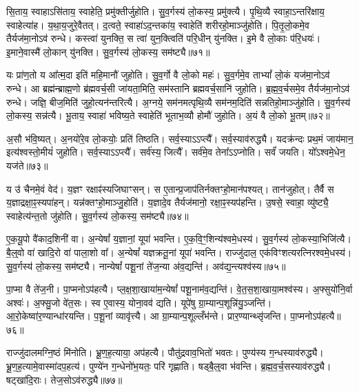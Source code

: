 सि॒ताय॒ स्वाहा\-ऽसि॑ताय॒ स्वाहेति॒ प्रमु॑क्तीर्जुहोति।
सु॒व॒र्गस्य॑ लो॒कस्य॒ प्रमु॑क्त्यै।
पृ॒थि॒व्यै स्वाहा॒\-ऽन्तरि॑क्षाय॒ स्वाहेत्या॑ह।
य॒था॒\-य॒जु\-रे॒वै\-तत्।
द॒त्वते॒ स्वाहा॑\-ऽद॒न्तका॑य॒ स्वाहेति॑ शरीरहो॒माञ्जु॑होति।
पि॒तृ॒लो॒कमे॒व तैर्यज॑मा॒नोऽव॑ रुन्धे।
कस्त्वा॑ युनक्ति॒ स त्वा॑ युन॒क्त्विति॑ परि॒धीन् यु॑नक्ति।
इ॒मे वै लो॒काः प॑रि॒धयः॑।
इ॒माने॒वास्मै॑ लो॒कान् यु॑नक्ति।
सु॒व॒र्गस्य॑ लो॒कस्य॒ सम॑ष्ट्यै॥७१॥

यः प्रा॑ण॒तो य आ᳚त्म॒दा इति॑ महि॒मानौ॑ जुहोति।
सु॒व॒र्गो वै लो॒को महः॑।
सु॒व॒र्गमे॒व ताभ्यां᳚ लो॒कं यज॑मा॒नोऽव॑ रुन्धे।
आ ब्रह्म॑न्ब्राह्म॒णो ब्र॑ह्म\-वर्च॒सी जा॑यता॒मिति॒ सम॑स्तानि ब्रह्मवर्च॒सानि॑ जुहोति।
ब्र॒ह्म॒व॒र्चसमे॒व तैर्यज॑मा॒नोऽव॑ रुन्धे।
जज्ञि॒ बीज॒मिति॑ जुहो॒त्यन॑न्तरित्यै।
अ॒ग्नये॒ सम॑नमत्पृथि॒व्यै सम॑नम॒दिति॑ सन्नतिहो॒माञ्जु॑होति।
सु॒व॒र्गस्य॑ लो॒कस्य॒ सन्न॑त्यै।
भू॒ताय॒ स्वाहा॑ भविष्य॒ते स्वाहेति॑ भूताभ॒व्यौ होमौ॑ जुहोति।
अ॒यं वै लो॒को भू॒तम्॥७२॥

अ॒सौ भ॑वि॒ष्यत्।
अ॒नयो॑रे॒व लो॒कयोः॒ प्रति॑ तिष्ठति।
सर्व॒स्याऽऽप्त्यै᳚।
सर्व॒स्याव॑रुद्ध्यै।
यदक्र॑न्दः प्रथ॒मं जाय॑मान॒ इत्य॑श्वस्तो॒मीयं॑ जुहोति।
सर्व॒स्याऽऽप्त्यै᳚।
सर्व॑स्य॒ जित्यै᳚।
सर्व॑मे॒व तेना᳚ऽऽप्नोति।
सर्वं॑ जयति।
यो᳚ऽश्वमे॒धेन॒ यज॑ते॥७३॥

य उ॑ चैनमे॒वं वेद॑।
य॒ज्ञꣳ रक्षाꣴ॑स्यजिघाꣳसन्।
स ए॒तान्प्र॒जा\-प॑तिर्नक्तꣳहो॒मान॑पश्यत्।
तान॑जुहोत्।
तैर्वै स य॒ज्ञाद्रक्षा॒ꣴ॒स्यपा॑हन्।
यन्न॑क्तꣳहो॒माञ्जु॒होति॑।
य॒ज्ञादे॒व तैर्यज॑मानो॒ रक्षा॒ꣴ॒स्यप॑हन्ति।
उ॒षसे॒ स्वाहा॒ व्यु॑ष्ट्यै॒ स्वाहेत्य॑न्त॒तो जु॑होति।
सु॒व॒र्गस्य॑ लो॒कस्य॒ सम॑ष्ट्यै॥७४॥\anuvakamend[वै नभाꣳ॑सि॒ सूर्यो॒ ज्योतिः॒ सन्त॑त्यै॒ सम॑ष्ट्यै भू॒तं यज॑ते॒ नव॑ च]

ए॒क॒यू॒पो वै॑काद॒शिनी॑ वा।
अ॒न्येषां᳚ य॒ज्ञानां॒ यूपा॑ भवन्ति।
ए॒क॒वि॒ꣳ॒शिन्य॑श्वमे॒धस्य॑।
सु॒व॒र्गस्य॑ लो॒कस्या॒भिजि॑त्यै।
बै॒ल्॒वो वा॑ खादि॒रो वा॑ पाला॒शो वा᳚।
अ॒न्येषां᳚ यज्ञक्रतू॒नां यूपा॑ भवन्ति।
राज्जु॑दाल॒ एक॑विꣳशत्यरत्निरश्वमे॒धस्य॑।
सु॒व॒र्गस्य॑ लो॒कस्य॒ सम॑ष्ट्यै।
नान्येषां᳚ पशू॒नां ते॑ज॒न्या अ॑व॒द्यन्ति॑।
अव॑द्य॒न्त्यश्व॑स्य॥७५॥

पा॒प्मा वै ते॑ज॒नी।
पा॒प्मनो\-ऽप॑हत्यै।
प्ल॒क्ष॒शा॒खाया॑म॒न्येषां᳚ पशू॒नाम॑व॒द्यन्ति॑।
वे॒त॒स॒शा॒खाया॒मश्व॑स्य।
अ॒फ्सुयो॑नि॒र्वा अश्वः॑।
अ॒फ्सु॒जो वे॑त॒सः।
स्व ए॒वास्य॒ योना॒वव॑ द्यति।
यूपे॑षु ग्रा॒म्यान्\-प॒शून्नि॑यु॒ञ्जन्ति॑।
आ॒रो॒केष्वा॑र॒ण्यान्धा॑रयन्ति।
प॒शू॒नां व्यावृ॑त्त्यै।
आ ग्रा॒म्यान्प॒शूल्लँभ॑न्ते।
प्रार॒ण्यान्थ्सृ॑जन्ति।
पा॒प्मनो\-ऽप॑हत्यै॥७६॥\anuvakamend[अश्व॑स्य॒ व्यावृ॑त्त्यै॒ त्रीणि॑ च]

राज्जु॑दालमग्नि॒ष्ठं मि॑नोति।
भ्रू॒ण॒ह॒त्याया॒ अप॑हत्यै।
पौतु॑द्रवाव॒भितो॑ भवतः।
पुण्य॑स्य ग॒न्धस्याव॑रुद्ध्यै।
भ्रू॒ण॒ह॒त्या\-मे॒वा\-स्मा॑दप॒हत्य॑।
पुण्ये॑न ग॒न्धेनो॑भ॒यतः॒ परि॑ गृह्णाति।
षड्बै॒ल्॒वा भ॑वन्ति।
ब्र॒ह्म॒व॒र्च॒सस्याव॑रुद्ध्यै।
षट्खा॑दि॒राः।
तेज॒सो\-ऽव॑रुद्ध्यै॥७७॥

